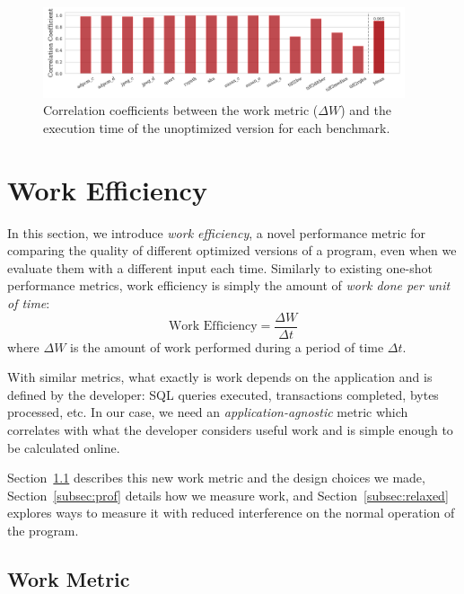 
\begin{figure}[t]
    \centering
    \includegraphics[width=0.95\textwidth]{figs/corr_coeff.pdf}
    \caption{Correlation coefficients between the work metric ($\Delta W$) and the execution time of the unoptimized version for each benchmark.}
    \label{fig:motivation-speedups}
\end{figure}


\section{Work Efficiency} \label{sec:work}

    In this section, we introduce \textit{work efficiency}, a novel performance metric for comparing the quality of different optimized
    versions of a program, even when we evaluate them with a different input each time. Similarly to existing one-shot performance metrics,
    work efficiency is simply the amount of \textit{work done per unit of time}:
    \[
        \textrm{Work Efficiency} = \frac{\Delta W}{\Delta t}
    \]
    where $\Delta W$ is the amount of work performed during a period of time $\Delta t$.

    With similar metrics, what exactly is work depends on the application and is defined by the developer: SQL queries executed,
    transactions completed, bytes processed, etc. In our case, we need an \emph{application-agnostic} metric which correlates with what
    the developer considers useful work and is simple enough to be calculated online.

    Section~\ref{subsec:workmetric} describes this new work metric and the design choices we made, Section~\ref{subsec:prof} details how
    we measure work, and Section~\ref{subsec:relaxed} explores ways to measure it with reduced interference on %
    the normal operation of the program.

    \subsection{Work Metric} \label{subsec:workmetric}


